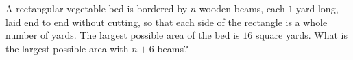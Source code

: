 A rectangular vegetable bed is bordered by $n$ wooden beams, each $1$ yard long, laid end to end without cutting, so that each side of the rectangle is a whole number of yards. The largest possible area of the bed is $16$ square yards. What is the largest possible area with $n+6$ beams?
